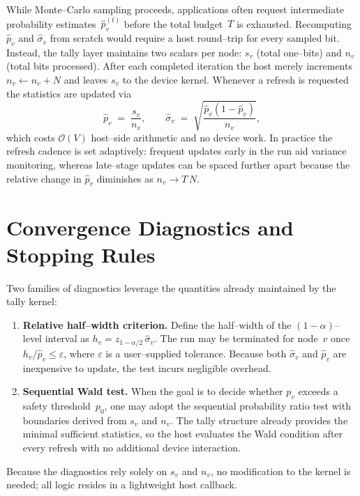 While Monte--Carlo sampling proceeds, applications often request intermediate
probability estimates~\(\widehat{p}_v^{(t)}\) before the total budget~\(T\) is
exhausted.  Recomputing \(\widehat{p}_v\) and
\(\widehat{\sigma}_v\) from scratch would require a host round--trip for every
sampled bit.  Instead, the tally layer maintains two scalars per node:
\(s_v\) (total one--bits) and \(n_v\) (total bits processed).  After each
completed iteration the host merely increments \(n_v\gets n_v + N\) and leaves
\(s_v\) to the device kernel.  Whenever a refresh is requested the statistics
are updated via
\[
  \widehat{p}_v\;=\;\frac{s_v}{n_v},
  \qquad
  \widehat{\sigma}_v\;=\;\sqrt{\frac{\widehat{p}_v(1-\widehat{p}_v)}{n_v}},
\]
which costs \(\mathcal{O}(V)\) host--side arithmetic and no device work.  In
practice the refresh cadence is set adaptively: frequent updates early in the
run aid variance monitoring, whereas late--stage updates can be spaced further
apart because the relative change in \(\widehat{p}_v\) diminishes as
\(n_v\to T\,N\).

\section{Convergence Diagnostics and Stopping Rules}
\label{subsec:tally_convergence}

Two families of diagnostics leverage the quantities already maintained by the
tally kernel:
\begin{enumerate}
  \item\textbf{Relative half--width criterion.}  Define the
        half--width of the \((1-\alpha)\)--level interval as
        \(h_v= z_{1-\alpha/2}\,\widehat{\sigma}_v\).  The run may be terminated
        for node~\(v\) once \(h_v/\widehat{p}_v\le \varepsilon\), where
        \(\varepsilon\) is a user--supplied tolerance.  Because both
        \(\widehat{\sigma}_v\) and \(\widehat{p}_v\) are inexpensive to update,
        the test incurs negligible overhead.
  \item\textbf{Sequential Wald test.}  When the goal is to decide whether
        \(p_v\) exceeds a safety threshold~\(p_0\), one may adopt the
        sequential probability ratio test with boundaries derived from
        \(s_v\) and \(n_v\).  The tally structure already provides the minimal
        sufficient statistics, so the host evaluates the Wald condition after
        every refresh with no additional device interaction.
\end{enumerate}
Because the diagnostics rely solely on \(s_v\) and \(n_v\), no modification to
the kernel is needed; all logic resides in a lightweight host callback.

